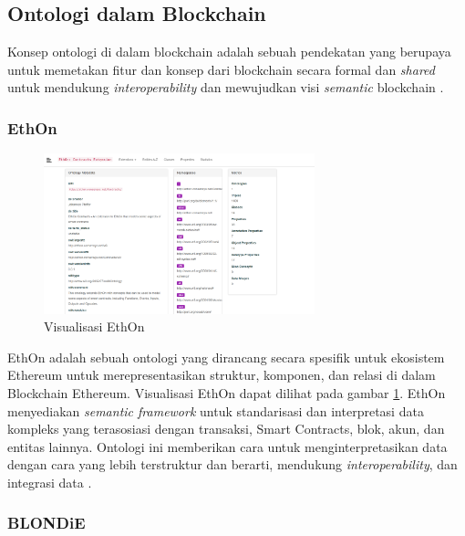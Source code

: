 \subsection{Ontologi dalam Blockchain}
\label{subsec:ontology-in-blockchain}

Konsep ontologi di dalam blockchain adalah sebuah pendekatan yang berupaya untuk memetakan fitur dan konsep dari blockchain secara formal dan \textit{shared} untuk mendukung \textit{interoperability} \parencite{9770809} dan mewujudkan visi \textit{semantic} blockchain \parencite{hector2020blondie}.

\subsubsection{EthOn}
\label{subsubsec:ethon}

\begin{figure}[ht]
	\centering
	\includegraphics[width=0.7\textwidth]{resources/chapter-2/ethon.png}
	\caption{Visualisasi EthOn \parencite{ethon2024}}
	\label{image:ethon}
\end{figure}

EthOn adalah sebuah ontologi yang dirancang secara spesifik untuk ekosistem Ethereum untuk merepresentasikan struktur, komponen, dan relasi di dalam Blockchain Ethereum. Visualisasi EthOn dapat dilihat pada gambar \ref{image:ethon}. EthOn menyediakan \textit{semantic framework} untuk standarisasi dan interpretasi data kompleks yang terasosiasi dengan transaksi, Smart Contracts, blok, akun, dan entitas lainnya. Ontologi ini memberikan cara untuk menginterpretasikan data dengan cara yang lebih terstruktur dan berarti, mendukung \textit{interoperability}, dan integrasi data \parencite{pfeffer2016ethon}.

\subsubsection{BLONDiE}
\label{subsubsec:blondie}

